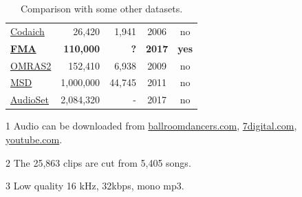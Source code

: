\documentclass{article}
\newcommand{\todo}[1]{{\color{red} #1 }}
\begin{document}
\begin{table}[t]
\begin{threeparttable}
\begin{tabular}{lrrcc}
		\href{http://jmir.sourceforge.net/index_Codaich.html}{Codaich} \cite{codaich} & 26,420 & 1,941 & 2006 & no \\ %
		\bf \href{https://github.com/mdeff/fma/}{FMA} & \bf 110,000 & \bf \todo{?} & \bf 2017 & \bf yes \\
		\href{http://www.omras2.org/}{OMRAS2} \cite{omras} & 152,410 & 6,938 & 2009 & no \\
		\href{https://labrosa.ee.columbia.edu/millionsong/}{MSD} \cite{msd} & 1,000,000 & 44,745 & 2011 & no\tnote{1} \\
		\href{https://research.google.com/audioset/}{AudioSet} \cite{audioset} & 2,084,320 & - & 2017 & no\tnote{1} \\
		\bottomrule
	\end{tabular}
	\begin{tablenotes}
		\item[1] Audio can be downloaded from \href{http://www.ballroomdancers.com}{ballroomdancers.com}, \href{https://www.7digital.com}{7digital.com}, \href{https://www.youtube.com}{youtube.com}.
		\item[2] The 25,863 clips are cut from 5,405 songs.
		\item[3] Low quality 16 kHz, 32kbps, mono mp3.
	\end{tablenotes}
	\end{threeparttable}
	\caption{Comparison with some other datasets.} %
	\label{tab:datasets}
\end{table}
\end{document}
